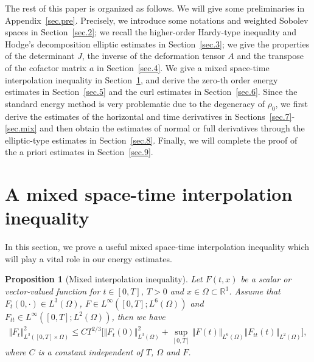 \documentclass[12pt,twoside,reqno]{amsart}
\numberwithin{equation}{section}
\newtheorem{proposition}[theorem]{Proposition}
\theoremstyle{definition}
\theoremstyle{remark}
\begin{document}
The rest of this paper is organized as follows. We will give some preliminaries in Appendix~\ref{sec.pre}. Precisely, we introduce some notations and weighted Sobolev spaces in Section~\ref{sec.2}; we recall the higher-order Hardy-type inequality and Hodge's decomposition elliptic estimates in Section~\ref{sec.3}; we give the properties of the determinant $J$, the inverse of the deformation tensor $A$ and the transpose of the cofactor matrix $a$ in Section~\ref{sec.4}. We give a mixed space-time interpolation inequality in Section~\ref{sec.interpolation}, and derive the zero-th order energy estimates in Section~\ref{sec.5} and the curl estimates in Section~\ref{sec.6}. Since the standard energy method is very problematic due to the degeneracy of ${\rho_0}$, we first derive the estimates of the horizontal and time derivatives in Sections~\ref{sec.7}-\ref{sec.mix} and then obtain the estimates of normal or full derivatives through the elliptic-type estimates in Section~\ref{sec.8}. Finally, we will complete the proof of the a priori estimates in Section~\ref{sec.9}.

\section{A mixed space-time interpolation inequality}\label{sec.interpolation}

In this section, we prove a useful mixed space-time interpolation inequality which will play a vital role in our energy estimates.
\begin{proposition}[Mixed interpolation inequality] \label{prop.interpolation}
  Let $F(t,x)$ be a scalar or vector-valued function for $t\in [0,T]$, $T>0$ and $x\in \Omega\subset {\mathbb R}^3$. Assume that $F_t(0,\cdot)\in L^3(\Omega)$, $F\in L^\infty([0,T]; L^6(\Omega))$ and $F_{tt}\in L^\infty([0,T]; L^2(\Omega))$, then we have
  \begin{align}\label{eq.interpolation}
    {\Vert{F_t}\Vert}_{L^3([0,T]\times\Omega)}^2{\leqslant} CT^{2/3}\Big[{\Vert{F_t(0)}\Vert}_{L^3(\Omega)}^2+\sup_{[0,T]}{\Vert{F(t)}\Vert}_{L^6(\Omega)} {\Vert{F_{tt}(t)}\Vert}_{L^2(\Omega)}\Big],
  \end{align}
  where $C$ is a constant independent of $T$, $\Omega$ and $F$.
\end{proposition}
\end{document}
